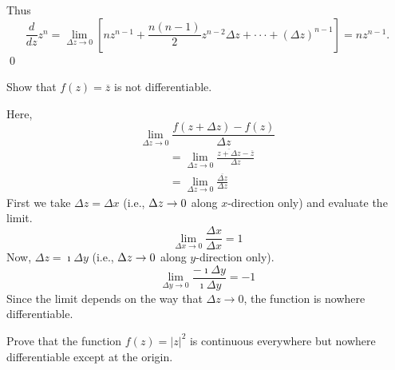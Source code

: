 Thus $$\frac{d}{dz}z^n=\lim_{\Delta z \to 0}\left[nz^{n-1}+\frac{n(n-1)}{2}z^{n-2}\Delta z+\cdot\cdot\cdot+(\Delta z)^{n-1}\right]=nz^{n-1}.$$
\qed

\begin{example}
  \label{ex_conj_z}
  Show that $f(z) = \overline{z}$ is not differentiable.
\end{example}
\begin{solution}
    Here,
    \[  \lim_{\Delta z \to 0}\frac{f(z+\Delta z)-f(z)}{\Delta z} \]
  \begin{align*}
     &= \lim_{\Delta z \to 0} \frac{\overline{z + \Delta z}-\overline{z}}{\Delta z} 
    \\
    &= \lim_{\Delta z \to 0} \frac{\overline{\Delta z}}{\Delta z} 
  \end{align*}
  First we take $\Delta z = \Delta x$ (i.e., $\Delta z \rightarrow 0$ along $x$-direction only) and evaluate the limit.
  \[ 
  \lim_{\Delta x \to 0} \frac{\Delta x}{\Delta x} = 1
  \]
  Now, $\Delta z = \imath \Delta y$ (i.e., $\Delta z \rightarrow 0$ along $y$-direction only).
  \[ 
  \lim_{\Delta y \to 0} \frac{-\imath \Delta y}{\imath \Delta y} = -1
  \]
  Since the limit depends on the way that $\Delta z \to 0$, the
  function is nowhere differentiable.  
\end{solution}
\begin{example}
Prove that the function $f(z)=|z|^2$ is continuous everywhere but nowhere differentiable except at the origin.
\end{example}

